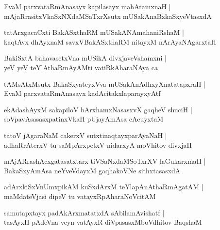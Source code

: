 \documentclass[twoside,12pt,openright]{book}
\newcounter{shloka}[chapter]
\begin{document}
\begin{shloka}%
EvaM parxvataRmAnasayx kapilasayx mahAtamxnaH |\\
mAjaRrasitxVkaSxNXdaMSaTxrXsutx mUSakAnaBxkaSxyeVtasxdA
\end{shloka}

\begin{shloka}%
tatArxgacaCxti BakASxthaRM mUSakANAmahaniRshaM |\\
kaqtAvx dhAyxnaM savxVBakASxthaRM nitayxM nArAyaNAgarxtaH
\end{shloka}

\begin{shloka}%
BakiSxtA bahavasetxVna mUSikA divxjaveVshamxni |\\
yeV yeV teYlAthaRmAyAMti vatiRkAharaNAya ca 
\end{shloka}

\begin{shloka}%
tAMsAtxMsutx BakaSxyateyxVva mUSakAnAdhxyXnatatapxraH |\\
EvaM parxvataRmAnasayx kadAcitakxlaparayxyAtf
\end{shloka}

\begin{shloka}%
ekAdashAyxM sakapiloV bArxhamxNasasxvX gaqheV shuciH |\\
soVpavAsasasxpatinxVkaH pUjayAmAsa cAcuyxtaM 
\end{shloka}

\begin{shloka}%
tatoV jAgaraNaM cakerxV sutxtinaqtayxparAyaNaH |\\
adhaRrAterxV tu saMpArxpetxV nidarxyA moVhitov divxjaH 
\end{shloka}

\begin{shloka}%
mAjARrashAcxgatasatxtarx tiVSaNxdaMSoTxrXV laGukarxmaH |\\
BakaSxyAmAsa neYveVdayxM gaqhakoVNe sithxtasasxdA
\end{shloka}

\begin{shloka}%
adArxkiSxVnUmxpikAM kuSxdArxM teYlapAnAthaRmAgatAM |\\
maMdateVjasi dipeV tu vatayxRpAharaNoVcitAM 
\end{shloka}

\begin{shloka}%
samutapxtayx padAkArxmatatxdA sAbilamAvishatf |\\
tasAyxH pAdeVna veyn vatAyxR diVpasasxMboVdhitov BaqshaM 
\end{shloka}
\end{document}
